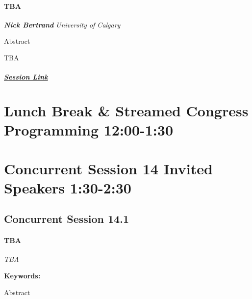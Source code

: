 \documentclass[
]{book}
\begin{document}
\begin{keynote}
 \hypertarget{tba}{%
 \paragraph*{TBA}\label{tba}}
 
 \textbf{\emph{Nick Bertrand}} \textbar{} \emph{University of Calgary}
 
 Abstract
 
 TBA
 
 \hypertarget{session-link}{%
 \subparagraph*{\texorpdfstring{\href{}{Session
 Link}}{Session Link}}\label{session-link}}
 \end{keynote}

\hypertarget{lunch-break-streamed-congress-programming-1200-130-1}{%
\section*{Lunch Break \& Streamed Congress Programming \textbar{} 12:00-1:30}\label{lunch-break-streamed-congress-programming-1200-130-1}}

\hypertarget{concurrent-session-14-invited-speakers-130-230}{%
\section*{Concurrent Session 14 \textbar{} Invited Speakers \textbar{} 1:30-2:30}\label{concurrent-session-14-invited-speakers-130-230}}

\hypertarget{concurrent-session-14.1}{%
\subsection*{Concurrent Session 14.1}\label{concurrent-session-14.1}}

\begin{speaker}
\hypertarget{tba}{%
\paragraph{\texorpdfstring{\textbf{TBA}}{TBA}}\label{tba}}

\emph{TBA}

\textbf{Keywords:}

Abstract
\end{speaker}
\end{document}
